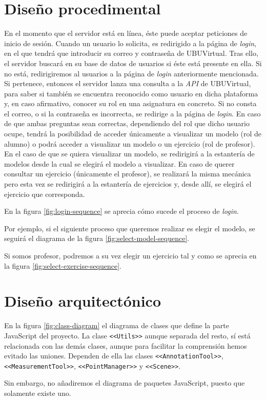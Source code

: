 \section{Diseño procedimental}
En el momento que el servidor está en línea, éste puede aceptar peticiones de inicio de sesión. Cuando un usuario lo solicita, es redirigido a la página de \textit{login}, en el que tendrá que introducir su correo y contraseña de UBUVirtual. Tras ello, el servidor buscará en su base de datos de usuarios si éste está presente en ella. Si no está, redirigiremos al usuarios a la página de \textit{login} anteriormente mencionada. Si pertenece, entonces el servidor lanza una consulta a la \textit{API} de UBUVirtual, para saber si también se encuentra reconocido como usuario en dicha plataforma y, en caso afirmativo, conocer su rol en una asignatura en concreto. Si no consta el correo, o si la contraseña es incorrecta, se redirige a la página de \textit{login}. En caso de que ambas preguntas sean correctas, dependiendo del rol que dicho usuario ocupe, tendrá la posibilidad de acceder únicamente a visualizar un modelo (rol de alumno) o podrá acceder a visualizar un modelo o un ejercicio (rol de profesor). En el caso de que se quiera visualizar un modelo, se redirigirá a la estantería de modelos desde la cual se elegirá el modelo a visualizar. En caso de querer consultar un ejercicio (únicamente el profesor), se realizará la misma mecánica pero esta vez se redirigirá a la estantería de ejercicios y, desde allí, se elegirá el ejercicio que corresponda.

En la figura \ref{fig:login-sequence} se aprecia cómo sucede el proceso de \textit{login}.

Por ejemplo, si el siguiente proceso que queremos realizar es elegir el modelo, se seguirá el diagrama de la figura \ref{fig:select-model-sequence}.

Si somos profesor, podremos a su vez elegir un ejercicio tal y como se aprecia en la figura \ref{fig:select-exercise-sequence}.

\section{Diseño arquitectónico}\label{sec:diseño-arquitectonico}
En la figura \ref{fig:class-diagram} el diagrama de clases que define la parte JavaScript del proyecto. La clase \texttt{<<Utils>>} aunque separada del resto, sí está relacionada con las demás clases, aunque para facilitar la comprensión hemos evitado las uniones. Dependen de ella las clases \texttt{<<AnnotationTool>>}, \texttt{<<MeasurementTool>>}, \texttt{<<PointManager>>} y \texttt{<<Scene>>}.

Sin embargo, no añadiremos el diagrama de paquetes JavaScript, puesto que solamente existe uno.


